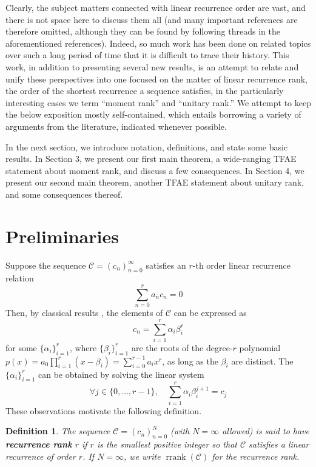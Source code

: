 \documentclass[12pt,reqno]{article}
\newtheorem{definition}{Definition}
\DeclareMathOperator{\rrank}{rrank}
\begin{document}
Clearly, the subject matters connected with linear recurrence order are vast, and there is not space here to discuss them all (and many important references are therefore omitted, although they can be found by following threads in the aforementioned references).  Indeed, so much work has been done on related topics over such a long period of time that it is difficult to trace their history.  This work, in addition to presenting several new results, is an attempt to relate and unify these perspectives into one focused on the matter of linear recurrence rank, the order of the shortest recurrence a sequence satisfies, in the particularly interesting cases we term ``moment rank'' and ``unitary rank.''  We attempt to keep the below exposition mostly self-contained, which entails borrowing a variety of arguments from the literature, indicated whenever possible.

In the next section, we introduce notation, definitions, and state some basic results.  In Section 3, we present our first main theorem, a wide-ranging TFAE statement about moment rank, and discuss a few consequences.  In Section 4, we present our second main theorem, another TFAE statement about unitary rank, and some consequences thereof.

\section{Preliminaries}

Suppose the sequence $\mathcal{C} = (c_n)_{n=0}^\infty$ satisfies an $r$-th order linear recurrence relation
\begin{equation} \label{eq:recurrence}
\sum_{n=0}^{r} a_n c_{n} = 0
\end{equation}
Then, by classical results \cite{EvePooShpWar2003}, the elements of $\mathcal{C}$ can be expressed as
$$
c_n = \sum_{i=1}^r \alpha_i \beta_i^r
$$
for some $\{\alpha_i\}_{i=1}^r$, where $\{\beta_i\}_{i=1}^r$ are the roots of the degree-$r$ polynomial $p(x) = a_0 \prod_{i=1}^r (x-\beta_i) = \sum_{i=0}^{r-1} a_i x^r $, as long as the $\beta_i$ are distinct.  The $\{\alpha_i\}_{i=1}^r$ can be obtained by solving the linear system
\begin{equation} \label{eq:linsys}
\forall j \in \{0,\ldots,r-1\}, \quad \sum_{i=1}^r \alpha_i \beta_i^{j+1} = c_j
\end{equation}
These observations motivate the following definition. 

\begin{definition}\label{Def:rank}
The sequence $\mathcal{C} = (c_n)_{n=0}^N$ (with $N = \infty$ allowed) is said to have \textbf{recurrence rank} $r$ if $r$ is the smallest positive integer so that $\mathcal{C}$ satisfies a linear recurrence of order $r$. If $N = \infty$, we write $\rrank(\mathcal{C})$ for the recurrence rank.
\end{definition}
\end{document}
